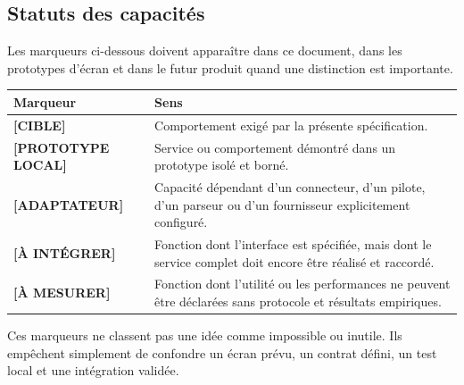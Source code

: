 \documentclass[11pt,a4paper]{article}
\newcommand{\SPECCLASS}[1]{\textcolor{blue!55!black}{\textbf{[#1]}}}
\begin{document}
\subsection{Statuts des capacités}
Les marqueurs ci-dessous doivent apparaître dans ce document, dans les prototypes d'écran et dans le futur produit quand une distinction est importante.
\begin{longtable}{p{}p{}}
\toprule
\textbf{Marqueur} & \textbf{Sens}\\
\midrule
\SPECCLASS{CIBLE} & Comportement exigé par la présente spécification.\\
\SPECCLASS{PROTOTYPE LOCAL} & Service ou comportement démontré dans un prototype isolé et borné.\\
\SPECCLASS{ADAPTATEUR} & Capacité dépendant d'un connecteur, d'un pilote, d'un parseur ou d'un fournisseur explicitement configuré.\\
\SPECCLASS{À INTÉGRER} & Fonction dont l'interface est spécifiée, mais dont le service complet doit encore être réalisé et raccordé.\\
\SPECCLASS{À MESURER} & Fonction dont l'utilité ou les performances ne peuvent être déclarées sans protocole et résultats empiriques.\\
\bottomrule
\end{longtable}
Ces marqueurs ne classent pas une idée comme impossible ou inutile. Ils empêchent simplement de confondre un écran prévu, un contrat défini, un test local et une intégration validée.
\end{document}
